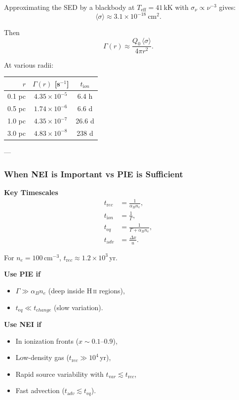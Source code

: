 \documentclass[paper=a4,fontsize=11pt]{scrartcl}
\numberwithin{equation}{section}		%
\numberwithin{figure}{section}			%
\numberwithin{table}{section}				%
\begin{document}
Approximating the SED by a blackbody at $T_{\mathrm{eff}}=41$\,kK with $\sigma_\nu \propto \nu^{-3}$ gives:
\[
\langle\sigma\rangle \approx 3.1\times 10^{-18}\ \mathrm{cm}^2.
\]

Then
\[
\Gamma(r) \approx \frac{Q_0\,\langle\sigma\rangle}{4\pi r^2}.
\]

At various radii:

\begin{tabular}{rcc}
$r$ & $\Gamma(r)$ [s$^{-1}$] & $t_{\mathrm ion}$ \\
\hline
0.1 pc & $4.35\times 10^{-5}$ & 6.4 h \\
0.5 pc & $1.74\times 10^{-6}$ & 6.6 d \\
1.0 pc & $4.35\times 10^{-7}$ & 26.6 d \\
3.0 pc & $4.83\times 10^{-8}$ & 238 d
\end{tabular}

---

\subsubsection{When NEI is Important vs PIE is Sufficient}

\textbf{Key Timescales}
\begin{align}
t_{\mathrm rec} &= \frac{1}{\alpha_B n_e}, \\
t_{\mathrm ion} &= \frac{1}{\Gamma}, \\
t_{\mathrm eq} &= \frac{1}{\Gamma + \alpha_B n_e}, \\
t_{\mathrm adv} &= \frac{\Delta x}{u}.
\end{align}

For $n_e=100$\,cm$^{-3}$, $t_{\mathrm rec} \approx 1.2\times 10^3$\,yr.

\textbf{Use PIE if}
\begin{itemize}
    \item $\Gamma \gg \alpha_B n_e$ (deep inside H\,\textsc{ii} regions),
    \item $t_{\mathrm eq} \ll t_{\mathrm change}$ (slow variation).
\end{itemize}

\textbf{Use NEI if}
\begin{itemize}
    \item In ionization fronts ($x \sim 0.1$--$0.9$),
    \item Low-density gas ($t_{\mathrm rec} \gg 10^4$\,yr),
    \item Rapid source variability with $t_{\mathrm var} \lesssim t_{\mathrm rec}$,
    \item Fast advection ($t_{\mathrm adv} \lesssim t_{\mathrm eq}$).
\end{itemize}
\end{document}
